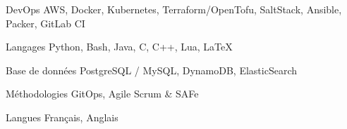 

\begin{cvskills}

  \cvskill
    {DevOps} %
    {AWS, Docker, Kubernetes, Terraform/OpenTofu, SaltStack, Ansible, Packer, GitLab CI} %

  \cvskill
    {Langages} %
    {Python, Bash, Java, C, C++, Lua, LaTeX} %

  \cvskill
    {Base de données} %
    {PostgreSQL / MySQL, DynamoDB, ElasticSearch} %

  \cvskill
    {Méthodologies} %
    {GitOps, Agile Scrum \& SAFe} %

  \cvskill
    {Langues} %
    {Français, Anglais} %

\end{cvskills}

